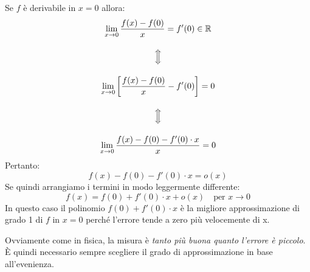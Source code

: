 Se $f$ è derivabile in $x = 0$ allora:
\begin{gather*}
	\lim_{x \to 0} \dfrac{f(x) - f(0)}{x} = f'(0) \in \mathbb{R}\\[10pt]
	\Big\Updownarrow\\[10pt]
	\lim_{x \to 0} \left[ \dfrac{f(x) - f(0)}{x} - f'(0)\right] = 0\\[10pt]
	\Big\Updownarrow\\[10pt]
	\lim_{x \to 0} \dfrac{f(x) - f(0) - f'(0) \cdot x}{x} = 0
\end{gather*}
Pertanto:
\begin{equation*}
	f(x) - f(0) - f'(0) \cdot x = o(x)
\end{equation*}
Se quindi arrangiamo i termini in modo leggermente differente:
\begin{equation*}
	f(x) = f(0) + f'(0) \cdot x + o(x) \quad \text{per } x \to 0
\end{equation*}
In questo caso il polinomio $f(0) + f'(0) \cdot x$ è la migliore approssimazione di grado 1 di $f$ in $x = 0$ perché l'errore tende a zero più velocemente di x.

Ovviamente come in fisica, la misura è \textit{tanto più buona quanto l'errore è piccolo}. È quindi necessario sempre scegliere il grado di approssimazione in base all'evenienza.

